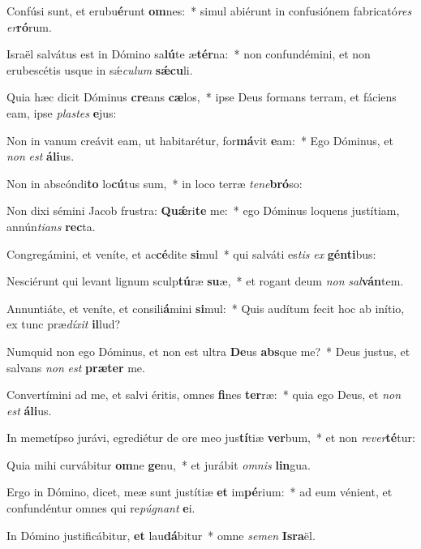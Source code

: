 \item Confúsi sunt, et erubu\textbf{é}runt \textbf{om}nes:~* simul abiérunt in confusiónem fabricató\textit{res} \textit{er}\textbf{ró}rum.
\item Israël salvátus est in Dómino sa\textbf{lú}te æ\textbf{tér}na:~* non confundémini, et non erubescétis usque in sǽ\textit{cu}\textit{lum} \textbf{sǽ}\textbf{cu}li.
\item Quia hæc dicit Dóminus \textbf{cre}ans \textbf{cæ}los,~* ipse Deus formans terram, et fáciens eam, ipse \textit{plas}\textit{tes} \textbf{e}jus:
\item Non in vanum creávit eam, ut habitarétur, for\textbf{má}vit \textbf{e}am:~* Ego Dóminus, et \textit{non} \textit{est} \textbf{á}\textbf{li}us.
\item Non in abscóndi\textbf{to} lo\textbf{cú}tus sum,~* in loco terræ \textit{te}\textit{ne}\textbf{bró}so:
\item Non dixi sémini Jacob frustra: \textbf{Quǽ}ri\textbf{te} me:~* ego Dóminus loquens justítiam, annún\textit{ti}\textit{ans} \textbf{rec}ta.
\item Congregámini, et veníte, et ac\textbf{cé}dite \textbf{si}mul~* qui salváti es\textit{tis} \textit{ex} \textbf{gén}\textbf{ti}bus:
\item Nesciérunt qui levant lignum sculp\textbf{tú}ræ \textbf{su}æ,~* et rogant deum \textit{non} \textit{sal}\textbf{ván}tem.
\item Annuntiáte, et veníte, et consili\textbf{á}mini \textbf{si}mul:~* Quis audítum fecit hoc ab inítio, ex tunc præ\textit{dí}\textit{xit} \textbf{il}lud?
\item Numquid non ego Dóminus, et non est ultra \textbf{De}us \textbf{abs}que me?~* Deus justus, et salvans \textit{non} \textit{est} \textbf{præ}\textbf{ter} me.
\item Convertímini ad me, et salvi éritis, omnes \textbf{fi}nes \textbf{ter}ræ:~* quia ego Deus, et \textit{non} \textit{est} \textbf{á}\textbf{li}us.
\item In memetípso jurávi, egrediétur de ore meo jus\textbf{tí}tiæ \textbf{ver}bum,~* et non \textit{re}\textit{ver}\textbf{té}tur:
\item Quia mihi curvábitur \textbf{om}ne \textbf{ge}nu,~* et jurábit \textit{om}\textit{nis} \textbf{lin}gua.
\item Ergo in Dómino, dicet, meæ sunt justítiæ \textbf{et} im\textbf{pé}rium:~* ad eum vénient, et confundéntur omnes qui re\textit{pú}\textit{gnant} \textbf{e}i.
\item In Dómino justificábitur, \textbf{et} lau\textbf{dá}bitur~* omne \textit{se}\textit{men} \textbf{Is}\textbf{ra}ël.
